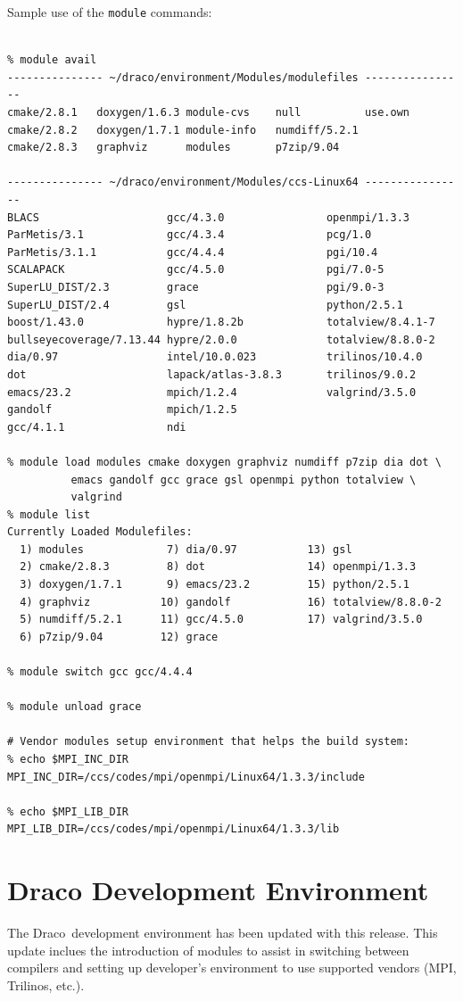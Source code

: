 \documentclass[note]{ResearchNote}
\newcommand{\draco}{Draco}
\begin{document}
\newpage
Sample use of the \texttt{module} commands:
\begin{lstlisting}[basicstyle=\footnotesize, xleftmargin=0.5in, 
  xrightmargin=0.5in]
% module clear 

% module avail
--------------- ~/draco/environment/Modules/modulefiles ----------------
cmake/2.8.1   doxygen/1.6.3 module-cvs    null          use.own
cmake/2.8.2   doxygen/1.7.1 module-info   numdiff/5.2.1
cmake/2.8.3   graphviz      modules       p7zip/9.04

--------------- ~/draco/environment/Modules/ccs-Linux64 ----------------
BLACS                    gcc/4.3.0                openmpi/1.3.3
ParMetis/3.1             gcc/4.3.4                pcg/1.0
ParMetis/3.1.1           gcc/4.4.4                pgi/10.4
SCALAPACK                gcc/4.5.0                pgi/7.0-5
SuperLU_DIST/2.3         grace                    pgi/9.0-3
SuperLU_DIST/2.4         gsl                      python/2.5.1
boost/1.43.0             hypre/1.8.2b             totalview/8.4.1-7
bullseyecoverage/7.13.44 hypre/2.0.0              totalview/8.8.0-2
dia/0.97                 intel/10.0.023           trilinos/10.4.0
dot                      lapack/atlas-3.8.3       trilinos/9.0.2
emacs/23.2               mpich/1.2.4              valgrind/3.5.0
gandolf                  mpich/1.2.5
gcc/4.1.1                ndi

% module load modules cmake doxygen graphviz numdiff p7zip dia dot \
          emacs gandolf gcc grace gsl openmpi python totalview \
          valgrind
% module list
Currently Loaded Modulefiles:
  1) modules             7) dia/0.97           13) gsl
  2) cmake/2.8.3         8) dot                14) openmpi/1.3.3
  3) doxygen/1.7.1       9) emacs/23.2         15) python/2.5.1
  4) graphviz           10) gandolf            16) totalview/8.8.0-2
  5) numdiff/5.2.1      11) gcc/4.5.0          17) valgrind/3.5.0
  6) p7zip/9.04         12) grace

% module switch gcc gcc/4.4.4

% module unload grace

# Vendor modules setup environment that helps the build system:
% echo $MPI_INC_DIR
MPI_INC_DIR=/ccs/codes/mpi/openmpi/Linux64/1.3.3/include

% echo $MPI_LIB_DIR
MPI_LIB_DIR=/ccs/codes/mpi/openmpi/Linux64/1.3.3/lib
\end{lstlisting}


\section{Draco Development Environment}
The \draco\ development environment has been updated with this
release.  This update inclues the introduction of \textsf{modules} to
assist in switching between compilers and setting up developer's
environment to use supported vendors (MPI, Trilinos, etc.).  
\end{document}

